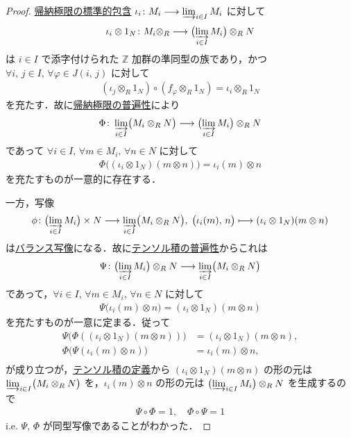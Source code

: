 \documentclass[algtopo_main]{subfiles}
\begin{document}
\begin{proof}
	\hyperref[def:indlim]{帰納極限の標準的包含} $\iota_i \colon M_i \longrightarrow \varinjlim_{i \in I}M_i$ に対して
	\begin{align}
		\iota_i \otimes 1_N \colon M_i \otimes_R \longrightarrow \bigl( \varinjlim_{i \in I} M_i \bigr) \otimes_R N
	\end{align}
	は $i \in I$ で添字付けられた $\mathbb{Z}$ 加群の準同型の族であり，かつ $\forall i,\, j \in I,\, \forall \varphi \in J(i,\, j)$ に対して
	\begin{align}
		(\iota_{j} \otimes_R 1_N ) \circ (f_\varphi \otimes_R 1_N ) = \iota_{i} \otimes_R 1_N
	\end{align}
	を充たす．故に\hyperref[prop:univ-indpropjlim]{帰納極限の普遍性}により
	\begin{align}
		\Phi \colon \varinjlim_{i \in I} \bigl( M_i \otimes_R N \bigr) \longrightarrow \bigl( \varinjlim_{i \in I} M_i \bigr) \otimes_R N
	\end{align}
	であって $\forall i\in I,\, \forall m \in M_i,\, \forall n \in N$ に対して
	\begin{align}
		\Phi \bigl( (\iota_i \otimes 1_N)(m \otimes n) \bigr) = \iota_i(m) \otimes n
	\end{align}
	を充たすものが一意的に存在する．

	一方，写像
	\begin{align}
		\phi \colon \bigl( \varinjlim_{i\in I} M_i \bigr) \times N \longrightarrow \varinjlim_{i \in I} \bigl( M_i \otimes_R N \bigr) ,\; \bigl( \iota_i(m),\, n \bigr) \longmapsto (\iota_i \otimes 1_N)(m \otimes n)
	\end{align}
	は\hyperref[def:R-balance]{バランス写像}になる．故に\hyperref[prop:univ-tensor]{テンソル積の普遍性}からこれは
	\begin{align}
		\Psi \colon \bigl( \varinjlim_{i\in I} M_i \bigr) \otimes_R N \longrightarrow \varinjlim_{i \in I} \bigl( M_i \otimes_R N \bigr) 
	\end{align}
	であって，$\forall i \in I,\, \forall m \in M_i,\, \forall n \in N$ に対して
	\begin{align}
		\Psi \bigl( \iota_i(m) \otimes n \bigr) = (\iota_i \otimes 1_N)(m \otimes n)
	\end{align}
	を充たすものが一意に定まる．従って
	\begin{align}
		\Psi \bigl(\Phi((\iota_i \otimes 1_N)(m \otimes n))  \bigr) &= (\iota_i \otimes 1_N)(m\otimes n), \\
		\Phi \bigl(\Psi(\iota_i(m) \otimes n)  \bigr) &= \iota_i (m)\otimes n, \\
	\end{align}
	が成り立つが，\hyperref[def:tensor]{テンソル積の定義}から $(\iota_i \otimes 1_N)(m \otimes n)$ の形の元は $\varinjlim_{i \in I} \bigl( M_i \otimes_R N \bigr)$ を，$\iota_i (m)\otimes n$ の形の元は $\bigl( \varinjlim_{i \in I}M_i \bigr) \otimes_R N$ を生成するので
	\begin{align}
		\Psi \circ \Phi = 1,\quad \Phi \circ \Psi = 1
	\end{align}
	i.e. $\Psi,\, \Phi$ が同型写像であることがわかった．
\end{proof}
\end{document}
